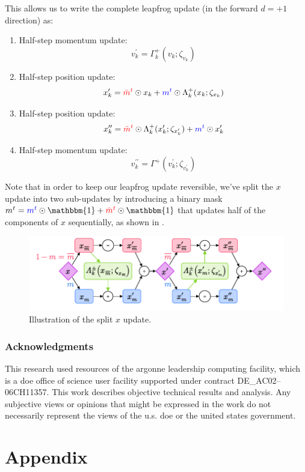 \documentclass{article} %
\newcommand{\mbart}{\textcolor{red}{\bar{m}^{t}}}
\newcommand{\mt}{\textcolor{blue}{m^{t}}}
\begin{document}
This allows us to write the complete leapfrog update (in the forward \(d=+1\) direction) as:
%
\begin{enumerate}
   \item Half-step momentum update:
      \begin{equation}
         v^{\prime}_{k} = \Gamma^{+}_{k}(v_{k};\zeta_{v_{k}})
      \end{equation}
   \item Half-step position update:
      \begin{equation}
         x^{\prime}_{k} = \mbart\odot x_{k} + \mt\odot \Lambda^{+}_{k}(x_{k};\zeta_{x_{k}})
      \end{equation}
   \item Half-step position update:
      \begin{equation}
         x^{\prime\prime}_{k} = \mbart\odot\Lambda^{+}_{k}(x^{\prime}_{k};\zeta_{x^{\prime}_{k}}) + \mt\odot x^{\prime}_{k}
      \end{equation}
   \item Half-step momentum update:
      \begin{equation}
         v^{\prime\prime}_{k} = \Gamma^{+}(v^{\prime}_{k}; \zeta_{v^{\prime}_{k}})
      \end{equation}
\end{enumerate}
%
Note that in order to keep our leapfrog update reversible, we've split the \(x\) update into two sub-updates by
introducing a binary mask \(m^{t} = \mt\odot\mathbbm{1} + \mbart\odot\mathbbm{1}\) that updates half of the components
of \(x\) sequentially, as shown in .
%
\begin{figure}[htpb]
   \centering
   \includegraphics[width=\textwidth]{figures/splitx.pdf}
   \caption{\label{fig:splitx}Illustration of the split \(x\) update.}
\end{figure}

\subsubsection*{Acknowledgments}
This research used resources of the argonne leadership computing facility, which is a doe office of science user
facility supported under contract DE\_AC02--06CH11357.%
%
This work describes objective technical results and analysis.
%
Any subjective views or opinions that might be expressed in the work do not necessarily represent the views of the u.s.
doe or the united states government.






\appendix
\section{Appendix}
\end{document}
